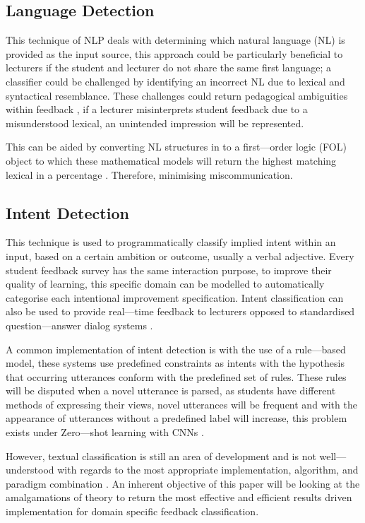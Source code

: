 \subsection{Language Detection}

This technique of NLP deals with determining which natural language (NL) is provided as the input source, this approach could be particularly beneficial to lecturers if the student and lecturer do not share the same first language; a classifier could be challenged by identifying an incorrect NL due to lexical and syntactical resemblance. These challenges could return pedagogical ambiguities within feedback \parencite{heift2017computer}, if a lecturer misinterprets student feedback due to a misunderstood lexical, an unintended impression will be represented.

This can be aided by converting NL structures in to a first---order logic (FOL) object to which these mathematical models will return the highest matching lexical in a percentage \parencite{perikos2017assistance}. Therefore, minimising miscommunication.

\subsection{Intent Detection}

This technique is used to programmatically classify implied intent within an input, based on a certain ambition or outcome, usually a verbal adjective. Every student feedback survey has the same interaction purpose, to improve their quality of learning, this specific domain can be modelled to automatically categorise each intentional improvement specification. Intent classification can also be used to provide real---time feedback to lecturers opposed to standardised question---answer dialog systems \parencite{jensen2020toward}.

A common implementation of intent detection is with the use of a rule---based model, these systems use predefined constraints as intents with the hypothesis that occurring utterances conform with the predefined set of rules. These rules will be disputed when a novel utterance is parsed, as students have different methods of expressing their views, novel utterances will be frequent and with the appearance of utterances without a predefined label will increase, this problem exists under Zero---shot learning with CNNs \parencite{xia2018zero}.

However, textual classification is still an area of development and is not well---understood with regards to the most appropriate implementation, algorithm, and paradigm combination \parencite{thangaraj2018text}. An inherent objective of this paper will be looking at the amalgamations of theory to return the most effective and efficient results driven implementation for domain specific feedback classification.

